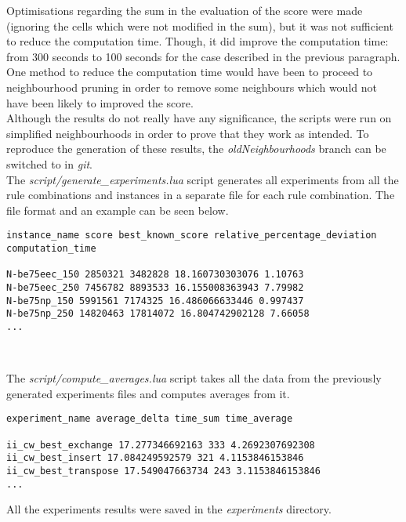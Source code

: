 Optimisations regarding the sum in the evaluation of the score were made
(ignoring the cells which were not modified in the sum), but it was not
sufficient to reduce the computation time. Though, it did improve the
computation time: from 300 seconds to 100 seconds for the case described in the
previous paragraph.\\

One method to reduce the computation time would have been to proceed to
neighbourhood pruning in order to remove some neighbours which would not have
been likely to improved the score.\\

Although the results do not really have any significance, the scripts were run
on simplified neighbourhoods in order to prove that they work as intended. To
reproduce the generation of these results, the \emph{oldNeighbourhoods} branch
can be switched to in \emph{git}.\\

The \emph{script/generate\_experiments.lua} script generates all experiments from
all the rule combinations and instances in a separate file for each rule
combination. The file format and an example can be seen below.\\

\begin{lstlisting}
instance_name score best_known_score relative_percentage_deviation computation_time

N-be75eec_150 2850321 3482828 18.160730303076 1.10763
N-be75eec_250 7456782 8893533 16.155008363943 7.79982
N-be75np_150 5991561 7174325 16.486066633446 0.997437
N-be75np_250 14820463 17814072 16.804742902128 7.66058
...
\end{lstlisting}
\

The \emph{script/compute\_averages.lua} script takes all the data from the
previously generated experiments files and computes averages from it.\\

\begin{lstlisting}
experiment_name average_delta time_sum time_average

ii_cw_best_exchange 17.277346692163 333 4.2692307692308
ii_cw_best_insert 17.084249592579 321 4.1153846153846
ii_cw_best_transpose 17.549047663734 243 3.1153846153846
...
\end{lstlisting}

\begin{framehint}
    All the experiments results were saved in the \emph{experiments} directory.
\end{framehint}

